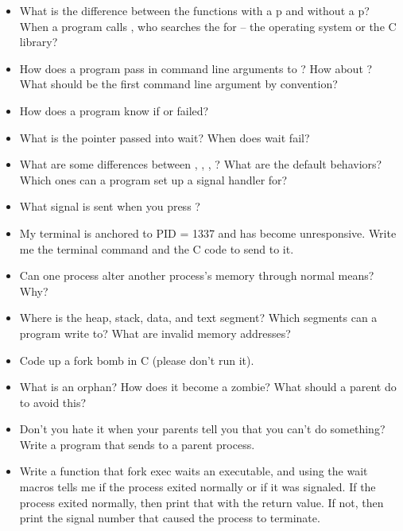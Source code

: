 \begin{itemize}
    \item
          What is the difference between the  functions with a p and without a p? When a program calls , who searches the  for  -- the operating system or the C library?
    \item
          How does a program pass in command line arguments to ? How about ? What should be the first command line argument by convention?
    \item
          How does a program know if  or  failed?
    \item
          What is the  pointer passed into wait? When does wait fail?
    \item
          What are some differences between , , , ? What are the default behaviors? Which ones can a program set up a signal handler for?
    \item
          What signal is sent when you press ?
    \item
          My terminal is anchored to PID = 1337 and has become unresponsive. Write me the terminal command and the C code to send  to it.
    \item
          Can one process alter another process's memory through normal means? Why?
    \item
          Where is the heap, stack, data, and text segment? Which segments can a program write to? What are invalid memory addresses?
    \item
          Code up a fork bomb in C (please don't run it).
    \item
          What is an orphan? How does it become a zombie? What should a parent do to avoid this?
    \item
      Don't you hate it when your parents tell you that you can't do something?
      Write a program that sends  to a parent process.
    \item
          Write a function that fork exec waits an executable, and using the wait macros tells me if the process exited normally or if it was signaled. If the process exited normally, then print that with the return value. If not, then print the signal number that caused the process to terminate.
\end{itemize}



